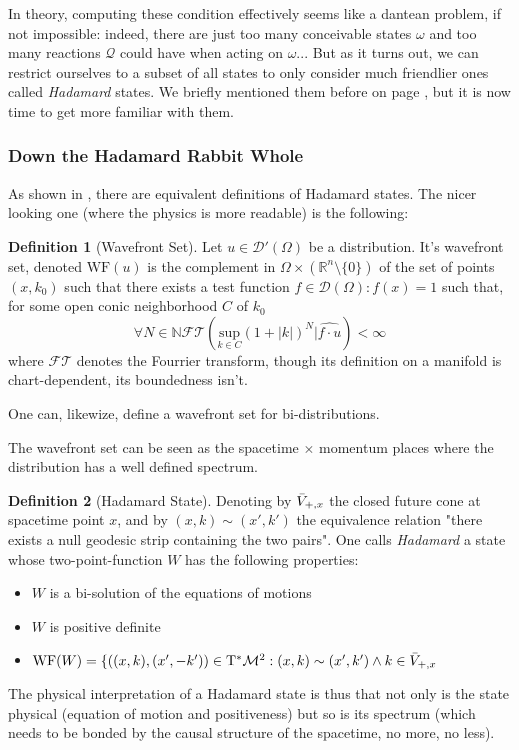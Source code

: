 \documentclass[a4paper,11pt]{article}
\numberwithin{equation}{section}
\theoremstyle{definition}
\newtheorem{definition}{Definition}
\begin{document}
In theory, computing these condition effectively seems like a dantean problem, if not impossible: indeed, there are just too many conceivable states $\omega$ and too many reactions $\mathcal{Q}$ could have when acting on $\omega$... But as it turns out, we can restrict ourselves to a subset of all states to only consider much friendlier ones called \emph{Hadamard} states. We briefly mentioned them before on page \pageref{FirstMentionHad}, but it is now time to get more familiar with them.
\subsubsection{Down the Hadamard Rabbit Whole} \label{DefHad}
As shown in \cite{HadEquiv}, there are equivalent definitions of Hadamard states. The nicer looking one (where the physics is more readable) is the following:
\begin{definition}[Wavefront Set]
    Let $u \in \mathcal{D}'(\Omega)$ be a distribution. It's wavefront set, denoted $\mathrm{WF}(u)$ is the complement in $\Omega\times(\mathbb{R}^n\setminus\{0\})$ of the set of points $(x,k_0)$ such that there exists a test function $f \in \mathcal{D}(\Omega): f(x)=1$  such that, for some open conic neighborhood $C$ of $k_0$ $$\forall N \in \mathbb{N} \mathcal{FT}(\underset{k\in C}{\mathrm{sup}} (1+|k|)^N|\hat{f\cdot u})<\infty$$
    where $\mathcal{FT}$ denotes the Fourrier transform, though its definition on a manifold is chart-dependent, its boundedness isn't.

    One can, likewize, define a wavefront set for bi-distributions.
\end{definition}
The wavefront set can be seen as the spacetime $\times$ momentum places where the distribution has a well defined spectrum.
\begin{definition}[Hadamard State]
    Denoting by $\Bar{V}_{+,x}$ the closed future cone at spacetime point $x$, and by $(x,k)\sim(x',k')$ the equivalence relation "there exists a null geodesic strip containing the two pairs". One calls \emph{Hadamard} a state whose two-point-function $W$ has the following properties:
    \begin{itemize}
        \item $W$ is a bi-solution of the equations of motions
        \item $W$ is positive definite
        \item $\mathrm{WF}(W)=\{ ((x,k),(x',-k'))\in \mathrm{T}^*\mathcal{M}^2 : (x,k)\sim(x',k')\wedge k \in \Bar{V}_{+,x}$
    \end{itemize}
\end{definition}
The physical interpretation of a Hadamard state is thus that not only is the state physical (equation of motion and positiveness) but so is its spectrum (which needs to be bonded by the causal structure of the spacetime, no more, no less).
\end{document}
